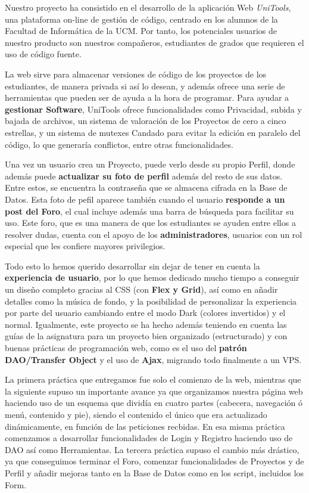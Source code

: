 \documentclass[12pt]{report}
\begin{document}
Nuestro proyecto ha consistido en el desarrollo de la aplicación Web \textit{UniTools}, una plataforma on-line de gestión de código, centrado en los alumnos de la Facultad de Informática de la UCM. Por tanto, los potenciales usuarios de nuestro producto son nuestros compañeros, estudiantes de grados que requieren el uso de código fuente.

La web sirve para almacenar versiones de código de los proyectos de los estudiantes, de manera privada si así lo desean, y además ofrece una serie de herramientas que pueden ser de ayuda a la hora de programar. Para ayudar a \textbf{gestionar Software}, UniTools ofrece funcionalidades como Privacidad, subida y bajada de archivos, un sistema de valoración de los Proyectos de cero a cinco estrellas, y un sistema de mutexes Candado para evitar la edición en paralelo del código, lo que generaría conflictos, entre otras funcionalidades.

Una vez un usuario crea un Proyecto, puede verlo desde su propio Perfil, donde además puede \textbf{actualizar su foto de perfil} además del resto de sus datos. Entre estos, se encuentra la contraseña que se almacena cifrada en la Base de Datos. Esta foto de pefil aparece también cuando el usuario \textbf{responde a un post del Foro}, el cual incluye además una barra de búsqueda para facilitar su uso. Este foro, que es una manera de que los estudiantes se ayuden entre ellos a resolver dudas, cuenta con el apoyo de los \textbf{administradores}, usuarios con un rol especial que les confiere mayores privilegios.

Todo esto lo hemos querido desarrollar sin dejar de tener en cuenta la \textbf{experiencia de usuario}, por lo que hemos dedicado mucho tiempo a conseguir un diseño completo gracias al CSS (con \textbf{Flex y Grid}), así como en añadir detalles como la música de fondo, y la posibilidad de personalizar la experiencia por parte del usuario cambiando entre el modo Dark (colores invertidos) y el normal. Igualmente, este proyecto se ha hecho además teniendo en cuenta las guías de la asignatura para un proyecto bien organizado (estructurado) y con buenas prácticas de programación web, como es el uso del \textbf{patrón DAO/Transfer Object} y el uso de \textbf{Ajax}, migrando todo finalmente a un VPS.

La primera práctica que entregamos fue solo el comienzo de la web, mientras que la siguiente supuso un importante avance ya que organizamos nuestra página web haciendo uso de un esquema que dividía en cuatro partes (cabecera, navegación ó menú, contenido y pie), siendo el contenido el único que era actualizado dinámicamente, en función de las peticiones recbidas. En esa misma práctica comenzamos a desarrollar funcionalidades de Login y Registro haciendo uso de DAO así como Herramientas. La tercera práctica supuso el cambio más drástico, ya que conseguimos terminar el Foro, comenzar funcionalidades de Proyectos y de Perfil y añadir mejoras tanto en la Base de Datos como en los script, incluidos los Form. 
\end{document}
